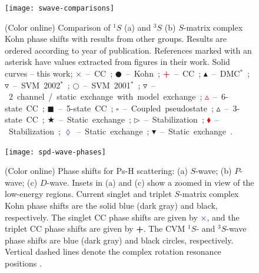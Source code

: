 \documentclass[preprint,showpacs,showkeys,preprintnumbers,amsmath,amssymb,longbibliography,pra,aps]{revtex4-1}
\begin{document}
\begin{figure}[H]
	\centering
	\texttt{[image: swave-comparisons]}
	\caption{(Color online) Comparison of $^1S$ (a) and $^3S$ (b) $S$-matrix
complex Kohn phase shifts with results from other groups. Results are ordered
according to year of publication. References marked with an asterisk have values
extracted from figures in their work. 
Solid curves -- this work;
\mbox{\textcolor{blue}{$\times$} -- CC \cite{Walters2004};}
\mbox{$\CIRCLE$ -- Kohn \cite{VanReeth2003};}
\mbox{\textcolor{red}{\textbf{+}} -- CC \cite{Blackwood2002};}
\mbox{$\blacktriangle$ -- DMC$^*$ \cite{Chiesa2002};} 
\mbox{$\triangledown$ -- SVM 2002$^*$ \cite{Ivanov2002};} 
\mbox{$\Circle$ -- SVM 2001$^*$ \cite{Ivanov2001};} 
\mbox{\textcolor[RGB]{0,127,0}{$\triangledown$} -- 2 channel / static exchange with model exchange \cite{Biswas2001};} 
\mbox{\textcolor{red}{$\vartriangle$} -- 6-state CC \cite{Sinha2000};} 
\mbox{$\blacksquare$ -- 5-state CC \cite{Adhikari1999};} 
\mbox{$\square$ -- Coupled pseudostate \cite{Campbell1998};} 
\mbox{$\vartriangle$ -- 3-state CC \cite{Sinha1997};} 
\mbox{\textcolor[RGB]{0,127,0}{$\bigstar$} -- Static exchange \cite{Ray1997,*Ray1996};} 
\mbox{$\triangleright$ -- Stabilization \cite{Drachman1976};} 
\mbox{\textcolor{red}{$\blacklozenge$} -- Stabilization \cite{Drachman1975};}
\mbox{\textcolor{blue}{$\lozenge$} -- Static exchange \cite{Hara1975};}
\mbox{$\blacktriangledown$ -- Static exchange \cite{Fraser1961}.}}
	\label{fig:swave-comparisons}
\end{figure}

\begin{figure}[H]
	\centering
	\texttt{[image: spd-wave-phases]}
	\caption{(Color online) Phase shifts for Ps-H scattering: (a) $S$-wave;
(b) $P$-wave; (c) $D$-wave. Insets in (a) and (c) show a zoomed in view of 
the low-energy regions. Current singlet and triplet $S$-matrix complex Kohn
phase shifts are the solid blue (dark gray)
and black, respectively. The singlet CC phase shifts
\cite{Walters2004} are given by \mbox{\textcolor{blue}{$\times$}}, and the
triplet CC phase shifts \cite{Blackwood2002} are given by
\mbox{\textcolor{black}{\textbf{+}}}. The CVM $^1S$- and $^3S$-wave phase shifts
\cite{Zhang2012} are blue (dark gray) and black circles,
respectively. Vertical dashed lines denote the complex rotation resonance
positions \cite{Yan1999,Yan1998a,Ho1998}.}
	\label{fig:spd-wave-phases}
\end{figure}
\end{document}

